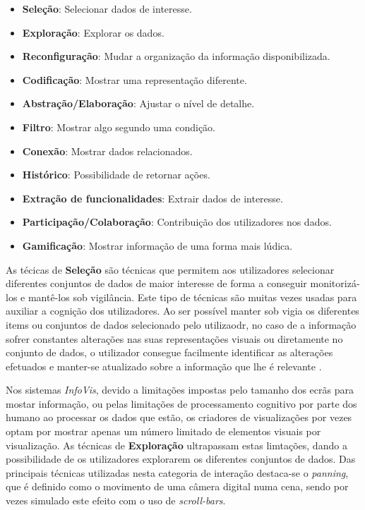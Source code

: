 \begin{itemize}
  \item \textbf{Seleção}: Selecionar dados de interesse.
  \item \textbf{Exploração}: Explorar os dados.
  \item \textbf{Reconfiguração}: Mudar a organização da informação disponibilizada.
  \item \textbf{Codificação}: Mostrar uma representação diferente.
  \item \textbf{Abstração/Elaboração}: Ajustar o nível de detalhe.
  \item \textbf{Filtro}: Mostrar algo segundo uma condição.
  \item \textbf{Conexão}: Mostrar dados relacionados.
  \item \textbf{Histórico}: Possibilidade de retornar ações. %
  \item \textbf{Extração de funcionalidades}: Extrair dados de interesse. %
  \item \textbf{Participação/Colaboração}: Contribuição dos utilizadores nos dados.
  \item \textbf{Gamificação}: Mostrar informação de uma forma mais lúdica.
\end{itemize}

As técicas de \textbf{Seleção} são técnicas que permitem aos utilizadores selecionar diferentes conjuntos de dados de maior interesse de forma a conseguir monitorizá-los e mantê-los sob vigilância. Este tipo de técnicas são muitas vezes usadas para auxiliar a cognição dos utilizadores. Ao ser possível manter sob vigia os diferentes items ou conjuntos de dados selecionado pelo utilizaodr, no caso de a informação sofrer constantes alterações nas suas representações visuais ou diretamente no conjunto de dados, o utilizador consegue facilmente identificar as alterações efetuados e manter-se atualizado sobre a informação que lhe é relevante \cite{yi2007toward, figueiras2015towards}.

Nos sistemas \textit{InfoVis}, devido a limitações impostas pelo tamanho dos ecrãs para mostar informação, ou pelas limitações de processamento cognitivo por parte dos humano ao processar os dados que estão, os criadores de visualizações por vezes optam por mostrar apenas um número limitado de elementos visuais por visualização. As técnicas de \textbf{Exploração} ultrapassam estas limtações, dando a possibilidade de os utilizadores explorarem os diferentes conjuntos de dados. Das principais técnicas utilizadas nesta categoria de interação destaca-se o \textit{panning}, que é definido como o movimento de uma câmera digital numa cena, sendo por vezes simulado este efeito com o uso de \textit{scroll-bars}. 

